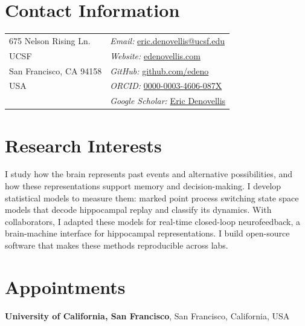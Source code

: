 \documentclass[margin,line,11pt]{res}
\newcommand*{\cvplace}[1]{\par#1\par\nobreak}
\begin{document}
\pagestyle{cvfooter}


\begin{resume}
\section{Contact Information}
\vspace{.05in}
\begin{tabular}{@{}p{1.9in}p{3.7in}}
675 Nelson Rising Ln.              & \textit{Email:}  \href{mailto:eric.denovellis@ucsf.edu}{eric.denovellis@ucsf.edu}\\            
UCSF	     & \textit{Website:}  \href{https://www.edenovellis.com}{edenovellis.com}\\
San Francisco, CA 94158  & \textit{GitHub:}  \href{https://github.com/edeno}{github.com/edeno}\\
USA & \textit{ORCID:}  \href{https://orcid.org/0000-0003-4606-087X}{0000-0003-4606-087X}\\
& \textit{Google Scholar:}  \href{https://scholar.google.com/citations?user=vuENbkoAAAAJ}{Eric Denovellis}
\end{tabular}

\section{Research Interests}	
I study how the brain represents past events and alternative possibilities, and how these representations support memory and decision-making. I develop statistical models to measure them: marked point process switching state space models that decode hippocampal replay and classify its dynamics. With collaborators, I adapted these models for real-time closed-loop neurofeedback, a brain-machine interface for hippocampal representations. I build open-source software that makes these methods reproducible across labs.

\section{Appointments}
\cvplace{\textbf{University of California, San Francisco}, San Francisco, California, USA}


\end{resume}
\end{document}
